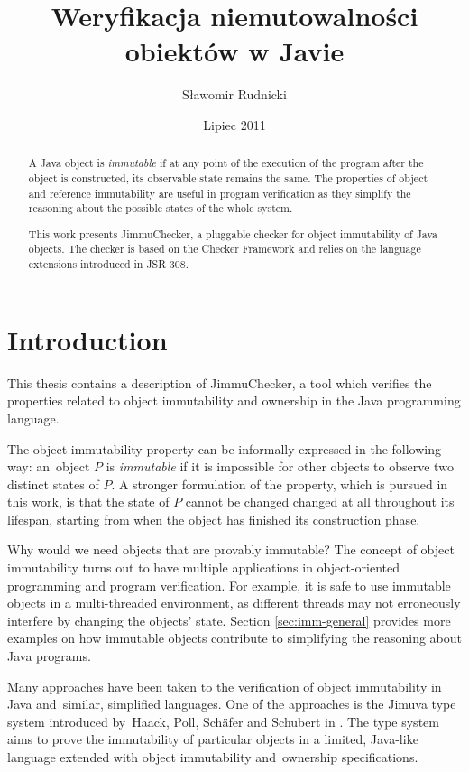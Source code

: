 \documentclass{pracamgr}
\author{Sławomir Rudnicki}
\title{Weryfikacja niemutowalności obiektów w Javie}
\date{Lipiec 2011}
\theoremstyle{break}
\theoremstyle{break}
\theoremstyle{break}
\begin{document}
\maketitle

\begin{abstract}
  A Java object is \emph{immutable} if at any point of the execution
  of the program after the object is constructed, its observable state
  remains the same. The properties of object and reference
  immutability are useful in program verification as they simplify the
  reasoning about the possible states of the whole system. 

  This work presents JimmuChecker, a pluggable checker for object
  immutability of Java objects. The checker is based on the Checker
  Framework and relies on the language extensions introduced in
  JSR 308.
\end{abstract}

\tableofcontents

\chapter{Introduction}
\label{chap:intro}

This thesis contains a description of JimmuChecker, a tool which
verifies the properties related to object immutability and ownership
in the Java programming language.

The object immutability property can be informally expressed in the
following way: an~object $P$ is \emph{immutable} if it is impossible
for other objects to observe two distinct states of $P$. A stronger
formulation of the property, which is pursued in this work, is that
the state of $P$ cannot be changed changed at all throughout its
lifespan, starting from when the object has finished its construction
phase.

Why would we need objects that are provably immutable? The concept of
object immutability turns out to have multiple applications in
object-oriented programming and program verification. For example, it
is safe to use immutable objects in a multi-threaded environment, as
different threads may not erroneously interfere by changing the
objects' state. Section \ref{sec:imm-general} provides more examples
on how immutable objects contribute to simplifying the reasoning about
Java programs.

Many approaches have been taken to the verification of object
immutability in Java and~similar, simplified languages. One of the
approaches is the Jimuva type system introduced by~Haack, Poll,
Schäfer and Schubert in \cite{haack}. The type system aims to prove
the im\-mu\-ta\-bi\-li\-ty of particular objects in a limited,
Java-like language extended with object immutability and~ownership
specifications.
\end{document}

